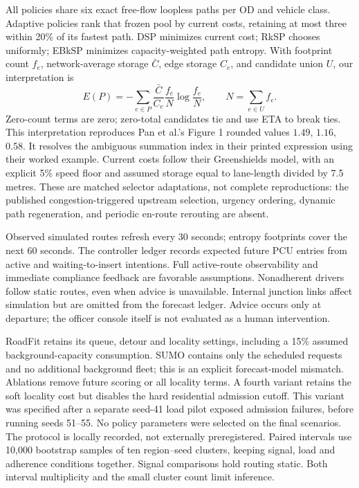 \documentclass[sigconf,anonymous,review]{acmart}
\begin{document}
All policies share six exact free-flow loopless paths per OD and vehicle class. Adaptive policies rank that frozen pool by current costs, retaining at most three within 20\% of its fastest path. DSP minimizes current cost; RkSP chooses uniformly; EBkSP minimizes capacity-weighted path entropy. With footprint count $f_e$, network-average storage $\bar C$, edge storage $C_e$, and candidate union $U$, our interpretation is
\begin{equation}
 E(P)=-\sum_{e\in P}\frac{\bar C}{C_e}\frac{f_e}{N}\log\frac{f_e}{N},
 \qquad N=\sum_{e\in U}f_e.
\end{equation}
Zero-count terms are zero; zero-total candidates tie and use ETA to break ties. This interpretation reproduces Pan et al.'s Figure 1 rounded values $1.49$, $1.16$, $0.58$. It resolves the ambiguous summation index in their printed expression using their worked example. Current costs follow their Greenshields model, with an explicit 5\% speed floor and assumed storage equal to lane-length divided by 7.5 metres. These are matched selector adaptations, not complete reproductions: the published congestion-triggered upstream selection, urgency ordering, dynamic path regeneration, and periodic en-route rerouting are absent.

Observed simulated routes refresh every 30 seconds; entropy footprints cover the next 60 seconds. The controller ledger records expected future PCU entries from active and waiting-to-insert intentions. Full active-route observability and immediate compliance feedback are favorable assumptions. Nonadherent drivers follow static routes, even when advice is unavailable. Internal junction links affect simulation but are omitted from the forecast ledger. Advice occurs only at departure; the officer console itself is not evaluated as a human intervention.

RoadFit retains its queue, detour and locality settings, including a 15\% assumed background-capacity consumption. SUMO contains only the scheduled requests and no additional background fleet; this is an explicit forecast-model mismatch. Ablations remove future scoring or all locality terms. A fourth variant retains the soft locality cost but disables the hard residential admission cutoff. This variant was specified after a separate seed-41 load pilot exposed admission failures, before running seeds 51--55. No policy parameters were selected on the final scenarios. The protocol is locally recorded, not externally preregistered. Paired intervals use 10,000 bootstrap samples of ten region--seed clusters, keeping signal, load and adherence conditions together. Signal comparisons hold routing static. Both interval multiplicity and the small cluster count limit inference.
\end{document}

